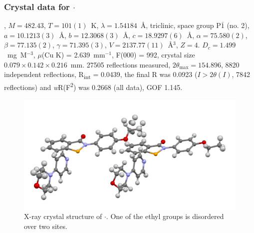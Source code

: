 \begin{refsection}
\subsubsection{Crystal data for \texorpdfstring{$ \cdot $}{C24 H25 N3 O3 Se}}
, $M=482.43$, $T=101(1)$~K, $\lambda=1.54184$~\AA, triclinic, space group P$\bar{1}$ (no. 2), $a = 10.1213(3)$~\AA, $b = 12.3068(3)$~\AA, $c = 18.9297(6)$~\AA, $\alpha = 75.580(2)$\degree, $\beta = 77.135(2)$\degree, $\gamma = 71.395(3)$\degree, $V = 2137.77(11)$~\AA$^{3}$, $Z = 4$. $D_{c}= 1.499$~mg~M$^{-3}$, $\mu$(Cu K\a) = 2.639~mm$^{-1}$, F(000) = 992, crystal size $0.079 \times 0.142 \times 0.216$~mm. 27505 reflections measured, $2\theta_{\max}=154.896$\degree, 8820 independent reflections, R\textsubscript{int} = 0.0439, the final R was 0.0923 ($I > 2\theta(I)$, 7842 reflections) and \textit{w}R(F\textsuperscript{2}) was 0.2668 (all data), GOF 1.145.

\begin{figure}
  \includegraphics[width=0.6\linewidth]{Figures/ebs-4oet-morph-xtal.pdf}
  \caption[X-ray crystal structure of \texorpdfstring{$ \cdot $}{C24 H25 N3 O3 Se}.]{X-ray crystal structure of \texorpdfstring{$ \cdot $}{C24 H25 N3 O3 Se}. One of the ethyl groups is disordered over two sites.}
\end{figure}

\printbibliography[heading=subbibliography]
\end{refsection}
